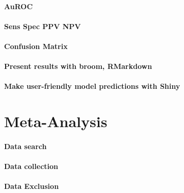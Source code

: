 \documentclass[
]{book}
\begin{document}
\hypertarget{auroc}{%
\subsubsection{AuROC}\label{auroc}}

\hypertarget{sens-spec-ppv-npv}{%
\subsubsection{Sens Spec PPV NPV}\label{sens-spec-ppv-npv}}

\hypertarget{confusion-matrix}{%
\subsubsection{Confusion Matrix}\label{confusion-matrix}}

\hypertarget{present-results-with-broom-rmarkdown}{%
\subsubsection{Present results with broom, RMarkdown}\label{present-results-with-broom-rmarkdown}}

\hypertarget{make-user-friendly-model-predictions-with-shiny}{%
\subsubsection{Make user-friendly model predictions with Shiny}\label{make-user-friendly-model-predictions-with-shiny}}

\hypertarget{meta-analysis}{%
\chapter{Meta-Analysis}\label{meta-analysis}}

\hypertarget{data-search}{%
\subsubsection{Data search}\label{data-search}}

\hypertarget{data-collection}{%
\subsubsection{Data collection}\label{data-collection}}

\hypertarget{data-exclusion}{%
\subsubsection{Data Exclusion}\label{data-exclusion}}
\end{document}
